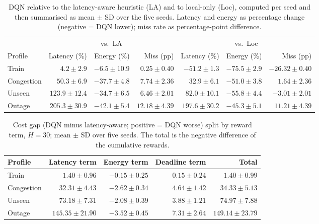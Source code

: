 \begin{table}[t]
\centering\small
\caption{DQN relative to the latency-aware heuristic (LA) and to local-only (Loc), computed per seed and then summarised as mean $\pm$ SD over the five seeds. Latency and energy as percentage change (negative = DQN lower); miss rate as percentage-point difference.}\label{tab:rel2}
\begin{tabular}{lrrrrrr}
\toprule
 & \multicolumn{3}{c}{vs.\ LA} & \multicolumn{3}{c}{vs.\ Loc}\\
\cmidrule(lr){2-4}\cmidrule(lr){5-7}
Profile & Latency (\%) & Energy (\%) & Miss (pp) & Latency (\%) & Energy (\%) & Miss (pp)\\
\midrule
Train & $4.2\pm2.9$ & $-6.5\pm10.9$ & $0.25\pm0.40$ & $-51.2\pm1.3$ & $-75.5\pm2.9$ & $-26.32\pm0.40$\\
Congestion & $50.3\pm6.9$ & $-37.7\pm4.8$ & $7.74\pm2.36$ & $32.9\pm6.1$ & $-51.0\pm3.8$ & $1.64\pm2.36$\\
Unseen & $123.9\pm12.4$ & $-34.7\pm6.5$ & $6.46\pm2.01$ & $82.0\pm10.1$ & $-55.8\pm4.4$ & $-3.01\pm2.01$\\
Outage & $205.3\pm30.9$ & $-42.1\pm5.4$ & $12.18\pm4.39$ & $197.6\pm30.2$ & $-45.3\pm5.1$ & $11.21\pm4.39$\\
\bottomrule
\end{tabular}
\end{table}

\begin{table}[t]
\centering\small
\caption{Cost gap (DQN minus latency-aware; positive = DQN worse) split by reward term, $H=30$; mean $\pm$ SD over five seeds. The total is the negative difference of the cumulative rewards.}\label{tab:gap}
\begin{tabular}{lrrrr}
\toprule
Profile & Latency term & Energy term & Deadline term & Total\\
\midrule
Train & $1.40\pm0.96$ & $-0.15\pm0.25$ & $0.15\pm0.24$ & $1.40\pm0.99$\\
Congestion & $32.31\pm4.43$ & $-2.62\pm0.34$ & $4.64\pm1.42$ & $34.33\pm5.13$\\
Unseen & $73.18\pm7.31$ & $-2.08\pm0.39$ & $3.88\pm1.21$ & $74.97\pm7.88$\\
Outage & $145.35\pm21.90$ & $-3.52\pm0.45$ & $7.31\pm2.64$ & $149.14\pm23.79$\\
\bottomrule
\end{tabular}
\end{table}
